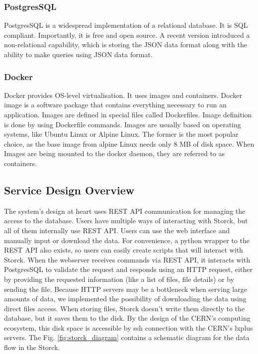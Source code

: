 \subsubsection{PostgresSQL}
PostgresSQL \cite{postgres} is a widespread implementation of a relational database. It is SQL compliant. Importantly, it is free and open source. A recent version introduced a non-relational capability, which is storing the JSON data format along with the ability to make queries using JSON data format.

\subsubsection{Docker}

Docker \cite{merkel2014docker} provides OS-level virtualisation. It uses images and containers. Docker image is a software package that contains everything necessary to run an application.
Images are defined in special files called Dockerfiles. Image definition is done by using Dockerfile commands.
Images are usually based on operating systems, like Ubuntu Linux or Alpine Linux.
The former is the most popular choice, as the base image from alpine Linux needs only 8 MB of disk space.
When Images are being mounted to the docker daemon, they are referred to as containers.

\subsection{Service Design Overview}

The system's design at heart uses REST API communication for managing the access to the database.
Users have multiple ways of interacting with Storck, but all of them internally use REST API.
Users can use the web interface and manually input or download the data.
For convenience, a python wrapper to the REST API also exists, so users can easily create scripts that will interact with Storck.
When the webserver receives commands via REST API, it interacts with PostgresSQL to validate the request and responds using an HTTP request, either by providing the requested information (like a list of files, file details) or by sending the file.
Because HTTP servers may be a bottleneck when serving large amounts of data, we implemented the possibility of downloading the data using direct files access.
When storing files, Storck doesn't write them directly to the database, but it saves them to the disk.
By the design of the CERN's computing ecosystem, this disk space is accessible by ssh connection with the CERN's lxplus servers.
The Fig. \ref{fig:storck_diagram} contains a schematic diagram for the data flow in the Storck.


